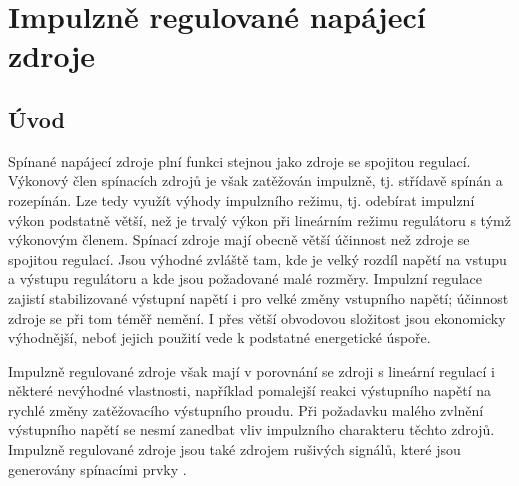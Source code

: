 \chapter{Impulzně regulované napájecí zdroje}
\minitoc
\newpage
  \section{Úvod}
    Spínané napájecí zdroje plní funkci stejnou jako zdroje se spojitou regulací. Vý\-ko\-no\-vý
    člen spínacích zdrojů je však zatěžován impulzně, tj. střídavě spínán a rozepínán. Lze tedy
    využít výhody impulzního režimu, tj. odebírat impulzní výkon podstatně větší, než je trvalý
    výkon při lineárním režimu regulátoru s týmž výkonovým členem. Spínací zdroje mají obecně větší
    účinnost než zdroje se spojitou regulací. Jsou výhodné zvláště tam, kde je velký rozdíl napětí
    na vstupu a výstupu regulátoru a kde jsou požadované malé rozměry. Impulzní regulace zajistí
    stabilizované výstupní napětí i pro velké změny vstupního napětí; účinnost zdroje se při tom
    téměř nemění. I přes větší obvodovou složitost jsou ekonomicky výhodnější, neboť jejich použití
    vede k podstatné energetické úspoře.
  
    Impulzně regulované zdroje však mají v porovnání se zdroji s lineární regulací i některé
    nevýhodné vlastnosti, například pomalejší reakci výstupního napětí na rychlé změny zatěžovacího
    výstupního proudu. Při požadavku malého zvlnění výstupního napětí se nesmí zanedbat vliv
    impulzního charakteru těchto zdrojů. Impulzně regulované zdroje jsou také zdrojem rušivých
    signálů, které jsou generovány spínacími prvky \cite[s.~112]{Hammembauer}.
       
   

